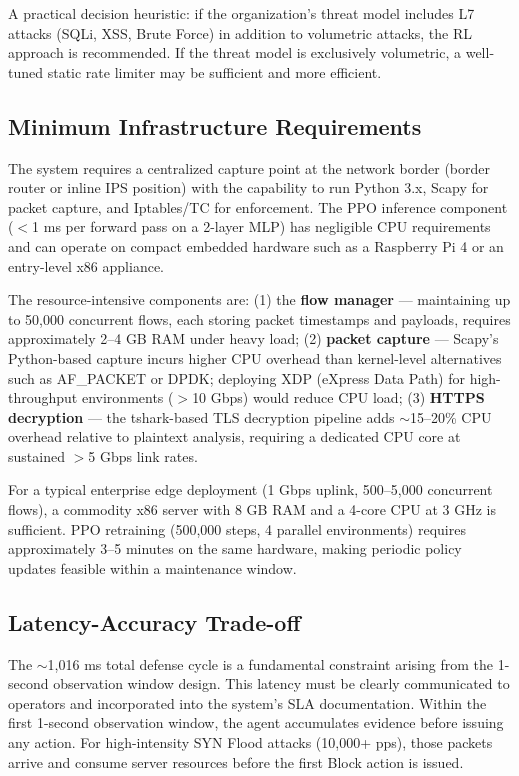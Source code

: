 \documentclass[12pt,a4paper]{report}
\begin{document}
A practical decision heuristic: if the organization's threat model includes L7 attacks (SQLi, XSS, Brute Force) in addition to volumetric attacks, the RL approach is recommended. If the threat model is exclusively volumetric, a well-tuned static rate limiter may be sufficient and more efficient.

\subsection{Minimum Infrastructure Requirements}

The system requires a centralized capture point at the network border (border router or inline IPS position) with the capability to run Python 3.x, Scapy for packet capture, and Iptables/TC for enforcement. The PPO inference component ($<$1 ms per forward pass on a 2-layer MLP) has negligible CPU requirements and can operate on compact embedded hardware such as a Raspberry Pi 4 or an entry-level x86 appliance.

The resource-intensive components are: (1) the \textbf{flow manager} --- maintaining up to 50,000 concurrent flows, each storing packet timestamps and payloads, requires approximately 2--4 GB RAM under heavy load; (2) \textbf{packet capture} --- Scapy's Python-based capture incurs higher CPU overhead than kernel-level alternatives such as AF\_PACKET or DPDK; deploying XDP (eXpress Data Path) for high-throughput environments ($>$10 Gbps) would reduce CPU load; (3) \textbf{HTTPS decryption} --- the tshark-based TLS decryption pipeline adds $\sim$15--20\% CPU overhead relative to plaintext analysis, requiring a dedicated CPU core at sustained $>$5 Gbps link rates.

For a typical enterprise edge deployment (1 Gbps uplink, 500--5,000 concurrent flows), a commodity x86 server with 8 GB RAM and a 4-core CPU at 3 GHz is sufficient. PPO retraining (500,000 steps, 4 parallel environments) requires approximately 3--5 minutes on the same hardware, making periodic policy updates feasible within a maintenance window.

\subsection{Latency-Accuracy Trade-off}

The $\sim$1,016 ms total defense cycle is a fundamental constraint arising from the 1-second observation window design. This latency must be clearly communicated to operators and incorporated into the system's SLA documentation. Within the first 1-second observation window, the agent accumulates evidence before issuing any action. For high-intensity SYN Flood attacks (10,000+ pps), those packets arrive and consume server resources before the first Block action is issued.
\end{document}
